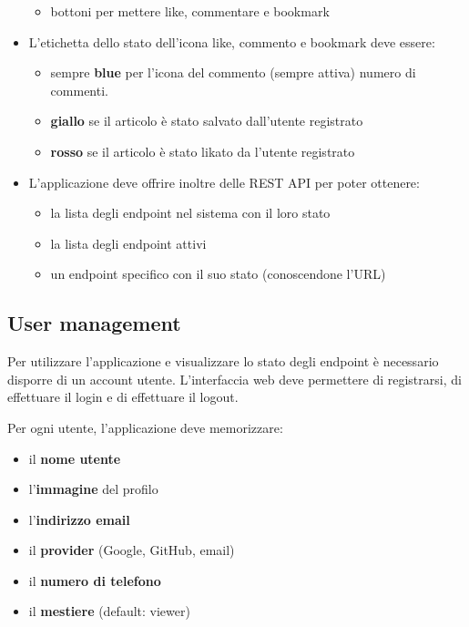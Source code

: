 \documentclass{article}
\begin{document}
\begin{itemize}
\begin{itemize}
            \item bottoni per mettere like, commentare e bookmark
        \end{itemize}
        \item L'etichetta dello stato dell'icona like, commento e bookmark deve essere:
        \begin{itemize}
            \item sempre \textbf{blue} per l'icona del commento (sempre attiva) numero di commenti.
            \item \textbf{giallo} se il articolo è stato salvato dall'utente registrato
            \item \textbf{rosso} se il articolo è stato likato da l'utente registrato
        \end{itemize}
        \item L'applicazione deve offrire inoltre delle REST API per poter ottenere:
        \begin{itemize}
            \item la lista degli endpoint nel sistema con il loro stato
            \item la lista degli endpoint attivi
            \item un endpoint specifico con il suo stato (conoscendone l'URL)
        \end{itemize}
    \end{itemize}

    \subsection{User management}

    Per utilizzare l'applicazione e visualizzare lo stato degli endpoint è necessario disporre di un account utente.
    L'interfaccia web deve permettere di registrarsi, di effettuare il login e di effettuare il logout.

    Per ogni utente, l'applicazione deve memorizzare:
    \begin{itemize}
        \item il \textbf{nome utente}
        \item l'\textbf{immagine} del profilo
        \item l'\textbf{indirizzo email}
        \item il \textbf{provider} (Google, GitHub, email)
        \item il \textbf{numero di telefono}
        \item il \textbf{mestiere} (default: viewer)
    \end{itemize}
\end{document}
